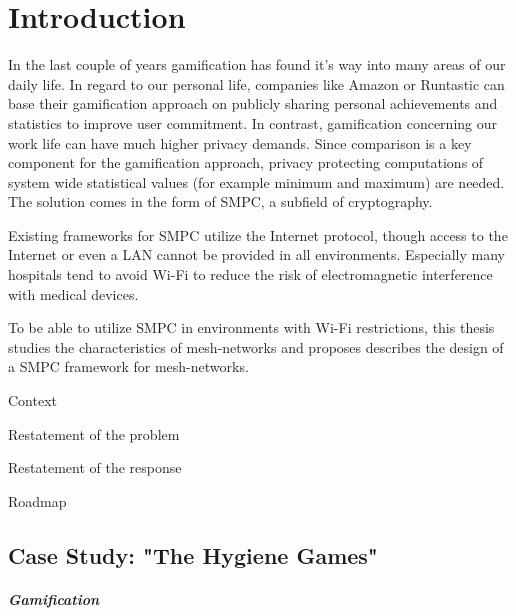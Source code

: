 \printnoidxglossary[type=\acronymtype,title={List of Acronyms}]

{\let\clearpage\relax \printnoidxglossary[type=symbols,sort=letter]}

\chapter{Introduction}
\label{Introduction}

In the last couple of years gamification has found it's way into many areas of our daily life. In regard to our personal life, companies like Amazon or Runtastic can base their gamification approach on publicly sharing personal achievements and statistics to improve user commitment. In contrast, gamification concerning our work life can have much higher privacy demands. Since comparison is a key component for the gamification approach, privacy protecting computations of system wide statistical values (for example minimum and maximum) are needed. The solution comes in the form of \gls{SMPC}, a subfield of cryptography.

Existing frameworks for \gls{SMPC} utilize the Internet protocol, though access to the Internet or even a \gls{LAN} cannot be provided in all environments. Especially many hospitals tend to avoid Wi-Fi to reduce the risk of electromagnetic interference with medical devices.

To be able to utilize \gls{SMPC} in environments with Wi-Fi restrictions, this thesis studies the characteristics of mesh-networks and proposes describes the design of a \gls{SMPC} framework for mesh-networks.

Context


Restatement of the problem

Restatement of the response

Roadmap

	\section{Case Study: "The Hygiene Games"}
	\label{Case Study: "The Hygiene Games"}

		\paragraph{Gamification}
	
